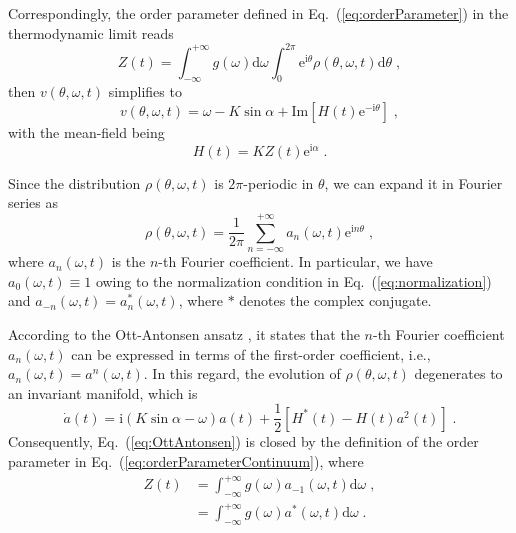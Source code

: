 \documentclass{article}
\begin{document}
Correspondingly, the order parameter defined in Eq.~(\ref{eq:orderParameter}) in the thermodynamic limit reads
\begin{equation}
    Z\left( t \right) =\int_{-\infty}^{+\infty}{g\left(\omega\right)\mathrm{d}\omega \int_0^{2\pi}{\mathrm{e}^{\mathrm{i}\theta}\rho \left( \theta ,\omega ,t \right) \mathrm{d}\theta }} \;,
    \label{eq:orderParameterContinuum}
\end{equation}
then $v\left( \theta ,\omega ,t \right)$ simplifies to
\begin{equation}
    v\left( \theta ,\omega ,t \right) =\omega -K\sin \alpha +\mathrm{Im}\left[ H\left( t \right) \mathrm{e}^{-\mathrm{i}\theta} \right] \;,
    \label{eq:velocityField}
\end{equation}
with the mean-field being
\begin{equation}
    H\left( t \right) =KZ\left( t \right) \mathrm{e}^{\mathrm{i}\alpha} \;.
\end{equation}

Since the distribution $\rho \left( \theta ,\omega ,t \right)$ is $2\pi$-periodic in $\theta$, we can expand it in Fourier series as
\begin{equation}
    \rho \left( \theta ,\omega ,t \right) =\frac{1}{2\pi}\sum_{n=-\infty}^{+\infty}{a _n\left( \omega ,t \right) \mathrm{e}^{\mathrm{i}n\theta}}\;,
    \label{eq:rhoFourier}
\end{equation}
where $a _n\left( \omega ,t \right)$ is the $n$-th Fourier coefficient. In particular, we have $a _0\left( \omega ,t \right) \equiv 1$ owing to the normalization condition in Eq.~(\ref{eq:normalization}) and $a _{-n}\left( \omega ,t \right) =a _n^{*}\left( \omega ,t \right)$, where $*$ denotes the complex conjugate.

According to the Ott-Antonsen ansatz \cite{10.1063/1.2930766,10.1063/1.3136851}, it states that the $n$-th Fourier coefficient $a_n\left(\omega, t\right)$ can be expressed in terms of the first-order coefficient, i.e., $a_n\left(\omega, t\right) = a^{n}\left(\omega, t\right)$. In this regard, the evolution of $\rho\left(\theta, \omega, t\right)$ degenerates to an invariant manifold, which is
\begin{equation}
    \dot{a}\left( t \right) =\mathrm{i}\left( K\sin \alpha -\omega \right) a\left( t \right) +\frac{1}{2}\left[ H^{*}\left( t \right) -H\left( t \right) a^2\left( t \right) \right] \;.
    \label{eq:OttAntonsen}
\end{equation}
Consequently, Eq.~(\ref{eq:OttAntonsen}) is closed by the definition of the order parameter in Eq.~(\ref{eq:orderParameterContinuum}), where
\begin{equation}
    \begin{aligned}
        Z\left( t \right) &=\int_{-\infty}^{+\infty}{g\left( \omega \right) a_{-1}\left( \omega ,t \right) \mathrm{d}\omega} \;,\\
        &=\int_{-\infty}^{+\infty}{g\left( \omega \right) a^{*}\left( \omega ,t \right) \mathrm{d}\omega} \;.\\
    \end{aligned}
    \label{eq:orderParameterOttAntonsen}
\end{equation}
\end{document}
